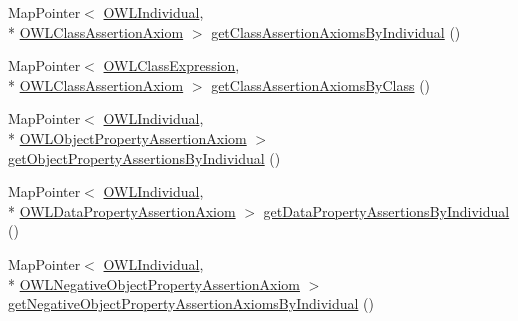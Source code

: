 \begin{DoxyCompactItemize}
\item 
Map\-Pointer$<$ \hyperlink{interfaceorg_1_1semanticweb_1_1owlapi_1_1model_1_1_o_w_l_individual}{O\-W\-L\-Individual}, \\*
\hyperlink{interfaceorg_1_1semanticweb_1_1owlapi_1_1model_1_1_o_w_l_class_assertion_axiom}{O\-W\-L\-Class\-Assertion\-Axiom} $>$ \hyperlink{classuk_1_1ac_1_1manchester_1_1cs_1_1owl_1_1owlapi_1_1_abstract_internals_impl_a7422a795a956404da6141c05e3b4217b}{get\-Class\-Assertion\-Axioms\-By\-Individual} ()
\item 
Map\-Pointer$<$ \hyperlink{interfaceorg_1_1semanticweb_1_1owlapi_1_1model_1_1_o_w_l_class_expression}{O\-W\-L\-Class\-Expression}, \\*
\hyperlink{interfaceorg_1_1semanticweb_1_1owlapi_1_1model_1_1_o_w_l_class_assertion_axiom}{O\-W\-L\-Class\-Assertion\-Axiom} $>$ \hyperlink{classuk_1_1ac_1_1manchester_1_1cs_1_1owl_1_1owlapi_1_1_abstract_internals_impl_adb4a11a9ad918975bf1414b58fc36508}{get\-Class\-Assertion\-Axioms\-By\-Class} ()
\item 
Map\-Pointer$<$ \hyperlink{interfaceorg_1_1semanticweb_1_1owlapi_1_1model_1_1_o_w_l_individual}{O\-W\-L\-Individual}, \\*
\hyperlink{interfaceorg_1_1semanticweb_1_1owlapi_1_1model_1_1_o_w_l_object_property_assertion_axiom}{O\-W\-L\-Object\-Property\-Assertion\-Axiom} $>$ \hyperlink{classuk_1_1ac_1_1manchester_1_1cs_1_1owl_1_1owlapi_1_1_abstract_internals_impl_a64ce094bea353505b454c440914fc91a}{get\-Object\-Property\-Assertions\-By\-Individual} ()
\item 
Map\-Pointer$<$ \hyperlink{interfaceorg_1_1semanticweb_1_1owlapi_1_1model_1_1_o_w_l_individual}{O\-W\-L\-Individual}, \\*
\hyperlink{interfaceorg_1_1semanticweb_1_1owlapi_1_1model_1_1_o_w_l_data_property_assertion_axiom}{O\-W\-L\-Data\-Property\-Assertion\-Axiom} $>$ \hyperlink{classuk_1_1ac_1_1manchester_1_1cs_1_1owl_1_1owlapi_1_1_abstract_internals_impl_a48da67551b5b9a622fb348d9c1070c75}{get\-Data\-Property\-Assertions\-By\-Individual} ()
\item 
Map\-Pointer$<$ \hyperlink{interfaceorg_1_1semanticweb_1_1owlapi_1_1model_1_1_o_w_l_individual}{O\-W\-L\-Individual}, \\*
\hyperlink{interfaceorg_1_1semanticweb_1_1owlapi_1_1model_1_1_o_w_l_negative_object_property_assertion_axiom}{O\-W\-L\-Negative\-Object\-Property\-Assertion\-Axiom} $>$ \hyperlink{classuk_1_1ac_1_1manchester_1_1cs_1_1owl_1_1owlapi_1_1_abstract_internals_impl_af70b9793e23c4d72e38b8ca0039c67af}{get\-Negative\-Object\-Property\-Assertion\-Axioms\-By\-Individual} ()

\end{DoxyCompactItemize}

